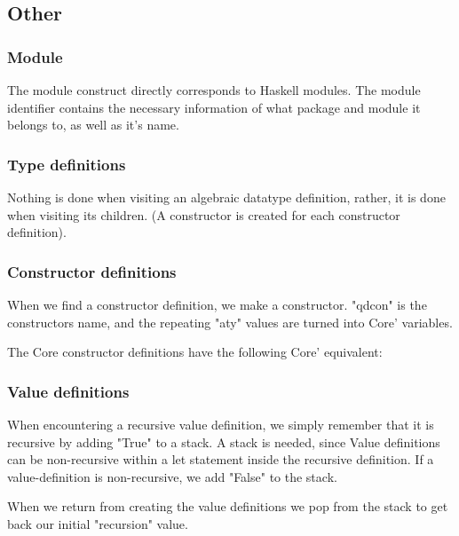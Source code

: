 \subsection{Other}











\subsubsection{Module}

The module construct directly corresponds to Haskell modules. The module identifier
contains the necessary information of what package and module it belongs to, as
well as it's name.

\subsubsection{Type definitions}


Nothing is done when visiting an algebraic datatype definition, rather, it is done when 
visiting its children. (A constructor is created for each constructor definition).

\subsubsection{Constructor definitions}

When we find a constructor definition, we make a constructor. "qdcon" is the 
constructors name, and the repeating "aty" values are turned into Core' variables.

The Core constructor definitions have the following Core' equivalent:

\subsubsection{Value definitions}

When encountering a recursive value definition, we simply remember that it is
recursive by adding "True" to a stack. A stack is needed, since Value definitions
can be non-recursive within a let statement inside the recursive definition. If
a value-definition is non-recursive, we add "False" to the stack.

When we return from creating the value definitions we pop from the stack to get
back our initial "recursion" value.

